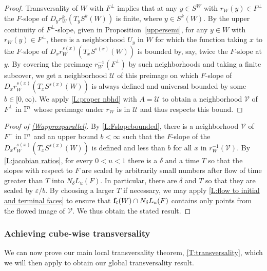 \begin{proof}
	Transversality of $W$ with $F^\perp$ implies that at any $y \in S^W$ with $r_W(y) \in F^\perp$ the $F$-slope of $D_yr^k_W(T_yS^k(W))$ is finite, where $y \in S^k(W)$.
	By the upper continuity of $F^\perp$-slope, given in Proposition~\ref{uppersemi}, for any $y \in W$ with $r_W(y) \in F^\perp$, there is a neighborhood $U_y$ in $W$ for which the function taking $x$ to the $F$-slope of $D_xr^{s(x)}_W(T_xS^{s(x)}(W))$ is bounded by, say, twice the $F$-slope at $y$.
	By covering the preimage $r_W^{-1}(F^\perp)$ by such neighborhoods and taking a finite subcover, we get a neighborhood ${\mathcal U}$ of this preimage on which $F$-slope of $D_xr^{s(x)}_W(T_xS^{s(x)}(W))$ is always defined and universal bounded by some $b \in [0,\infty)$.
	We apply \cref{L:proper nbhd} with $A = {\mathcal U}$ to obtain a neighborhood $\mathcal{V}$ of $F^\perp$ in $\mathbb{I}^n$ whose preimage under $r_W$ is in ${\mathcal U}$ and thus respects this bound.
\end{proof}

\begin{proof}[Proof of \cref{Wapproxparallel}]
	By \cref{L:Fslopebounded}, there is a neighborhood $\mathcal{V}$ of $F^-$ in $\mathbb{I}^n$ and an upper bound $b < \infty$ such that the $F$-slope of the $D_xr^{s(x)}_W(T_xS^{s(x)}(W))$ is defined and less than $b$ for all $x$ in $r_W^{-1}(\mathcal{V})$.
	By \cref{L:jacobian ratios}, for every $0 < u < 1$ there is a $\delta$ and a time $T$ so that the slopes with respect to $F$ are scaled by arbitrarily small numbers after flow of time greater than $T$ into $N_\delta L_u(F)$.
	In particular, there are $\delta$ and $T$ so that they are scaled by $\varepsilon/ b$.
	By choosing a larger $T$ if necessary, we may apply \cref{L:flow to initial and terminal faces} to ensure that $\mathbf{f}_t(W) \cap N_\delta L_u(F)$ contains only points from the flowed image of ${\mathcal{V}}$.
	We thus obtain the stated result.
\end{proof}

\subsubsection{Achieving cube-wise transversality}

We can now prove our main local transversality theorem, \cref{T:transversality}, which we will then apply to obtain our global transversality result.

